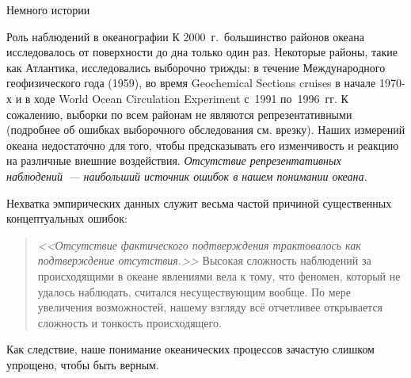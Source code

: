 \begin{chapter}{Немного истории}
\begin{section}{Роль наблюдений в океанографии}
К 2000~г.\ большинство районов океана исследовалось от поверхности до
дна только один раз. Некоторые районы, такие как Атлантика,
исследовались выборочно трижды:
в течение Международного геофизического года (1959), 
во время Geochemical Sections cruises в начале 1970-х
и в ходе World Ocean Circulation Experiment с~1991 по~1996~гг. 
К сожалению, выборки по всем районам не являются репрезентативными 
(подробнее об ошибках выборочного обследования см. врезку).
Наших измерений океана недостаточно для того, чтобы предсказывать его 
изменчивость и реакцию на различные внешние воздействия.
\emph{Отсутствие репрезентативных наблюдений~--- наибольший источник
ошибок в нашем понимании океана.}
%

Нехватка эмпирических данных служит весьма частой причиной существенных
концептуальных ошибок: 
\begin{quote}
\emph{<<Отсутствие фактического подтверждения трактовалось как подтверждение 
отсутствия.>>} Высокая сложность наблюдений за происходящими в океане явлениями
вела к тому, что феномен, который не удалось наблюдать, считался несуществующим
вообще. По мере увеличения возможностей, нашему взгляду всё отчетливее 
открывается сложность и тонкость происходящего.~\cite{Wunsch:2002a}
\end{quote}
Как следствие, наше понимание океанических процессов зачастую слишком упрощено,
чтобы быть верным.
%


\end{section}
\end{chapter}
